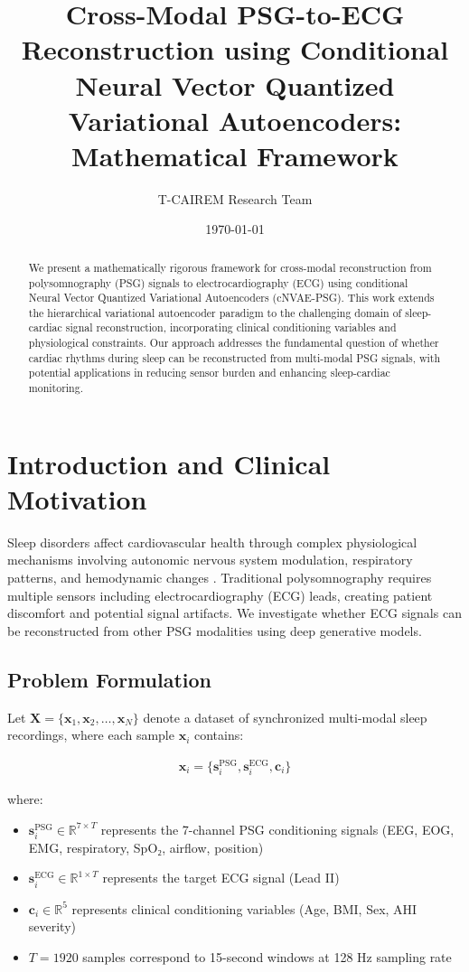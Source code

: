 \documentclass[11pt]{article}
\title{Cross-Modal PSG-to-ECG Reconstruction using Conditional Neural Vector Quantized Variational Autoencoders: Mathematical Framework}
\author{T-CAIREM Research Team}
\date{\today}
\begin{document}
\maketitle

\begin{abstract}
We present a mathematically rigorous framework for cross-modal reconstruction from polysomnography (PSG) signals to electrocardiography (ECG) using conditional Neural Vector Quantized Variational Autoencoders (cNVAE-PSG). This work extends the hierarchical variational autoencoder paradigm to the challenging domain of sleep-cardiac signal reconstruction, incorporating clinical conditioning variables and physiological constraints. Our approach addresses the fundamental question of whether cardiac rhythms during sleep can be reconstructed from multi-modal PSG signals, with potential applications in reducing sensor burden and enhancing sleep-cardiac monitoring.
\end{abstract}

\section{Introduction and Clinical Motivation}

Sleep disorders affect cardiovascular health through complex physiological mechanisms involving autonomic nervous system modulation, respiratory patterns, and hemodynamic changes \cite{somers2008sleep}. Traditional polysomnography requires multiple sensors including electrocardiography (ECG) leads, creating patient discomfort and potential signal artifacts. We investigate whether ECG signals can be reconstructed from other PSG modalities using deep generative models.

\subsection{Problem Formulation}

Let $\mathbf{X} = \{\mathbf{x}_1, \mathbf{x}_2, \ldots, \mathbf{x}_N\}$ denote a dataset of synchronized multi-modal sleep recordings, where each sample $\mathbf{x}_i$ contains:

\begin{align}
\mathbf{x}_i = \{\mathbf{s}_i^{\text{PSG}}, \mathbf{s}_i^{\text{ECG}}, \mathbf{c}_i\}
\end{align}

where:
\begin{itemize}
\item $\mathbf{s}_i^{\text{PSG}} \in \mathbb{R}^{7 \times T}$ represents the 7-channel PSG conditioning signals (EEG, EOG, EMG, respiratory, SpO₂, airflow, position)
\item $\mathbf{s}_i^{\text{ECG}} \in \mathbb{R}^{1 \times T}$ represents the target ECG signal (Lead II)
\item $\mathbf{c}_i \in \mathbb{R}^{5}$ represents clinical conditioning variables (Age, BMI, Sex, AHI severity)
\item $T = 1920$ samples correspond to 15-second windows at 128 Hz sampling rate
\end{itemize}
\end{document}
